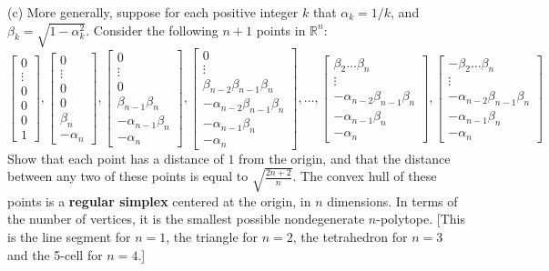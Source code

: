 \documentclass[leqno]{book}
\begin{document}
\begin{enumerate}
(c) More generally, suppose for each positive integer $k$ that $\alpha_k=1/k$, and $\beta_k=\sqrt{1-\alpha_k^2}$.  Consider the following $n+1$ points in $\mathbb R^n$:
$$\begin{bmatrix}0\\\vdots\\0\\0\\0\\1\end{bmatrix},\begin{bmatrix}0\\\vdots\\0\\0\\\beta_n\\-\alpha_n\end{bmatrix},\begin{bmatrix}0\\\vdots\\0\\\beta_{n-1}\beta_n\\-\alpha_{n-1}\beta_n\\-\alpha_n\end{bmatrix},\begin{bmatrix}0\\\vdots\\\beta_{n-2}\beta_{n-1}\beta_n\\-\alpha_{n-2}\beta_{n-1}\beta_n\\-\alpha_{n-1}\beta_n\\-\alpha_n\end{bmatrix},\dots,\begin{bmatrix}\beta_2\dots\beta_n\\\vdots\\-\alpha_{n-2}\beta_{n-1}\beta_n\\-\alpha_{n-1}\beta_n\\-\alpha_n\end{bmatrix},\begin{bmatrix}-\beta_2\dots\beta_n\\\vdots\\-\alpha_{n-2}\beta_{n-1}\beta_n\\-\alpha_{n-1}\beta_n\\-\alpha_n\end{bmatrix}$$
Show that each point has a distance of $1$ from the origin, and that the distance between any two of these points is equal to $\sqrt{\frac{2n+2}n}$.  The convex hull of these points is a \textbf{regular simplex} centered at the origin, in $n$ dimensions.  In terms of the number of vertices, it is the smallest possible nondegenerate $n$-polytope.  [This is the line segment for $n=1$, the triangle for $n=2$, the tetrahedron for $n=3$ and the 5-cell for $n=4$.]


\end{enumerate}
\end{document}
